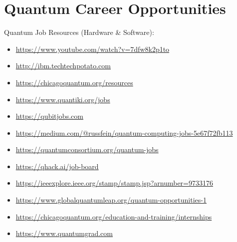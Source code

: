 \chapter{\LARGE {Quantum Career Opportunities}} 

\begin{flushleft}
\large{Quantum Job Resources (Hardware \& Software):}
\end{flushleft}

\large\begin{itemize}
\item\url{https://www.youtube.com/watch?v=7dfw8k2p1to}
\item\url{http://ibm.techtechpotato.com}
\item\url{https://chicagoquantum.org/resources} 
\item\url{https://www.quantiki.org/jobs} 
\item\url{https://qubitjobs.com} 
\item\url{https://medium.com/@russfein/quantum-computing-jobs-5e67f72fb113} 
\item\url{https://quantumconsortium.org/quantum-jobs} 
\item\url{https://qhack.ai/job-board} 
\item\url{https://ieeexplore.ieee.org/stamp/stamp.jsp?arnumber=9733176} 
\item\url{https://www.globalquantumleap.org/quantum-opportunities-1} 
\item\url{https://chicagoquantum.org/education-and-training/internships} 
\item\url{https://www.quantumgrad.com}

\end{itemize}
